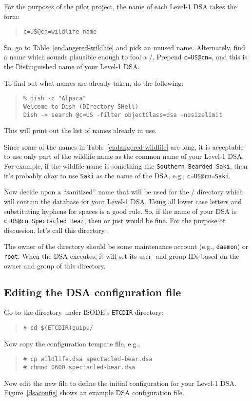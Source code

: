 For the purposes of the pilot project,
the name of each Level-1 DSA takes the form:
\begin{quote}\small\begin{verbatim}
c=US@cn=wildlife name
\end{verbatim}\end{quote}
So, go to Table~\ref{endangered-wildlife} and pick an unused name.
Alternately,
find a name which sounds plausible enough to fool a \camayoc/.
Prepend \verb"c=US@cn=",
and this is the Distinguished name of your Level-1 DSA.

To find out what names are already taken,
do the following:
\begin{quote}\small\begin{verbatim}
% dish -c "Alpaca"
Welcome to Dish (DIrectory SHell)
Dish -> search @c=US -filter objectClass=dsa -nosizelimit
\end{verbatim}\end{quote}
This will print out the list of names already in use.

Since some of the names in Table~\ref{endangered-wildlife} are long,
it is acceptable to use only part of the wildlife name as the common name
of your Level-1 DSA.
For example,
if the wildlife name is something like \verb"Southern Bearded Saki",
then it's probably okay to use \verb"Saki" as the name of the DSA,
e.g., \verb"c=US@cn=Saki".

Now decide upon a ``sanitized'' name that will be used for the
\unix/ directory which will contain the database for your Level-1 DSA.
Using all lower case letters and substituting hyphens for spaces is a good
rule.
So, if the name of your DSA is \verb"c=US@cn=Spectacled Bear",
then  or just  would be fine.
For the purpose of discussion,
let's call this directory .

The owner of the directory should be some maintenance account
(e.g., \verb"daemon") or \verb"root".
When the DSA executes,
it will set its user- and group-IDs based on the owner and group of this
directory.

\subsection	{Editing the DSA configuration file}
Go to the directory  under ISODE's \verb"ETCDIR" directory:
\begin{quote}\small\begin{verbatim}
# cd $(ETCDIR)quipu/
\end{verbatim}\end{quote}
Now copy the configuration tempate file, e.g.,
\begin{quote}\small\begin{verbatim}
# cp wildlife.dsa spectacled-bear.dsa
# chmod 0600 spectacled-bear.dsa
\end{verbatim}\end{quote}
Now edit the new file to define the initial configuration for your Level-1
DSA.
Figure~\ref{dsaconfig} shows an example DSA configuration file.

